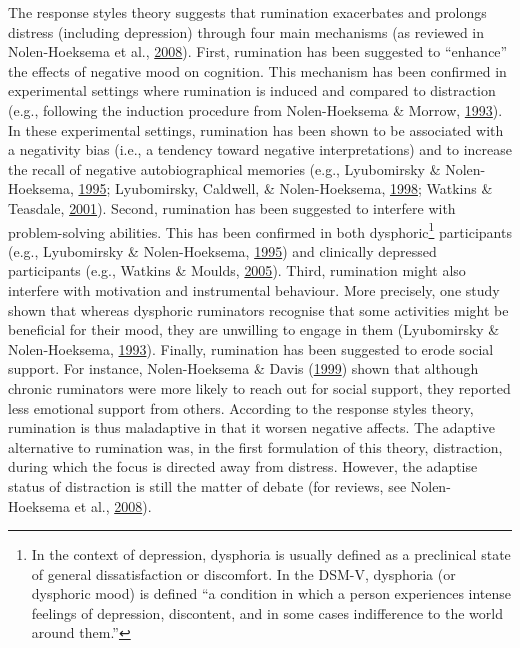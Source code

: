 \documentclass[a4paper,12pt,twoside,openright,oldfontcommands]{memoir}
\let\rmarkdownfootnote\footnote%
\def\footnote{\protect\rmarkdownfootnote}
\begin{document}
The response styles theory suggests that rumination exacerbates and prolongs distress (including depression) through four main mechanisms (as reviewed in Nolen-Hoeksema et al., \protect\hyperlink{ref-Nolen-Hoeksema2008}{2008}). First, rumination has been suggested to \enquote{enhance} the effects of negative mood on cognition. This mechanism has been confirmed in experimental settings where rumination is induced and compared to distraction (e.g., following the induction procedure from Nolen-Hoeksema \& Morrow, \protect\hyperlink{ref-nolen-hoeksema_effects_1993}{1993}). In these experimental settings, rumination has been shown to be associated with a negativity bias (i.e., a tendency toward negative interpretations) and to increase the recall of negative autobiographical memories (e.g., Lyubomirsky \& Nolen-Hoeksema, \protect\hyperlink{ref-lyubomirsky_effects_1995}{1995}; Lyubomirsky, Caldwell, \& Nolen-Hoeksema, \protect\hyperlink{ref-Lyubomirsky1998}{1998}; Watkins \& Teasdale, \protect\hyperlink{ref-watkins_rumination_2001}{2001}). Second, rumination has been suggested to interfere with problem-solving abilities. This has been confirmed in both dysphoric\footnote{In the context of depression, dysphoria is usually defined as a preclinical state of general dissatisfaction or discomfort. In the DSM-V, dysphoria (or dysphoric mood) is defined \enquote{a condition in which a person experiences intense feelings of depression, discontent, and in some cases indifference to the world around them.}} participants (e.g., Lyubomirsky \& Nolen-Hoeksema, \protect\hyperlink{ref-lyubomirsky_effects_1995}{1995}) and clinically depressed participants (e.g., Watkins \& Moulds, \protect\hyperlink{ref-watkins_distinct_2005}{2005}). Third, rumination might also interfere with motivation and instrumental behaviour. More precisely, one study shown that whereas dysphoric ruminators recognise that some activities might be beneficial for their mood, they are unwilling to engage in them (Lyubomirsky \& Nolen-Hoeksema, \protect\hyperlink{ref-lyubomirsky_self-perpetuating_1993}{1993}). Finally, rumination has been suggested to erode social support. For instance, Nolen-Hoeksema \& Davis (\protect\hyperlink{ref-nolen-hoeksema_thanks_1999}{1999}) shown that although chronic ruminators were more likely to reach out for social support, they reported less emotional support from others. According to the response styles theory, rumination is thus maladaptive in that it worsen negative affects. The adaptive alternative to rumination was, in the first formulation of this theory, distraction, during which the focus is directed away from distress. However, the adaptise status of distraction is still the matter of debate (for reviews, see Nolen-Hoeksema et al., \protect\hyperlink{ref-Nolen-Hoeksema2008}{2008}).
\end{document}
